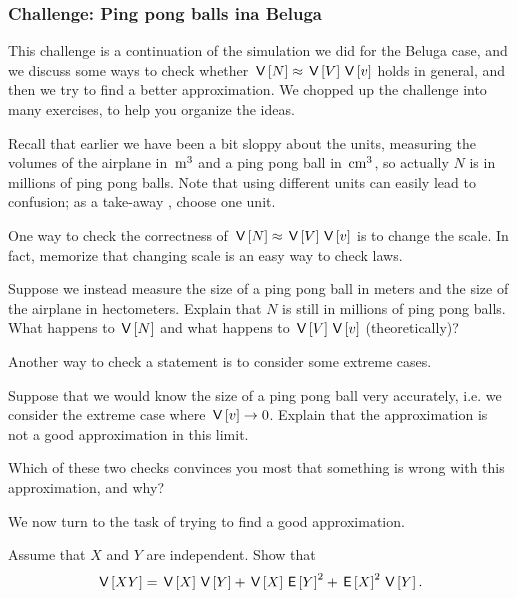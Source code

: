 \subsubsection{Challenge: Ping pong balls ina Beluga}

This challenge is a continuation of the simulation we did for the Beluga case, and we discuss some ways to check whether $\,\mathsf{V}\left[N\right] \approx \,\mathsf{V}\left[V\right] \,\mathsf{V}\left[v\right]$ holds in general, and then we try to find a better approximation. We chopped up the challenge into many exercises, to help you organize the ideas.


Recall that earlier we have been a bit sloppy about the units, measuring the volumes of the airplane in $\,\mathrm{m}^{3}$ and a ping pong ball in $\,\mathrm{cm}^{3}$, so actually $N$ is in millions of ping pong balls.
Note that using different units can easily lead to  confusion; as a take-away , choose one unit.

One way to check the correctness of $\,\mathsf{V}\left[N\right] \approx \,\mathsf{V}\left[V\right] \,\mathsf{V}\left[v\right]$ is to change the scale. In fact, memorize that changing scale is an easy way to check laws.

\begin{exercise}
Suppose we instead measure the size of a ping pong ball in meters and the size of the airplane in hectometers.
Explain that $N$ is still in millions of ping pong balls.
What happens to $\,\mathsf{V}\left[N\right]$ and what happens to $\,\mathsf{V}\left[V\right] \,\mathsf{V}\left[v\right]$ (theoretically)?
\end{exercise}


Another way to check a statement is to consider some extreme cases.

\begin{exercise} Suppose that we would know the size of a ping pong ball very accurately, i.e.  we consider the extreme case where $\,\mathsf{V}\left[v\right] \rightarrow 0$. Explain that the approximation is not a good approximation in this limit.
\end{exercise}


\begin{exercise}
Which of these two checks convinces you most that something is wrong with this approximation, and why?
\end{exercise}

We now turn to the task of trying to find a good approximation.

\begin{exercise} Assume that $X$ and $Y$ are independent. Show that
\begin{equation*}
\,\mathsf{V}\left[X Y\right] = \,\mathsf{V}\left[X\right] \,\mathsf{V}\left[Y\right] + \,\mathsf{V}\left[X\right] \,\mathsf{E}\left[Y\right]^2 + \,\mathsf{E}\left[X\right]^2 \,\mathsf{V}\left[Y\right].
\end{equation*}
\end{exercise}


